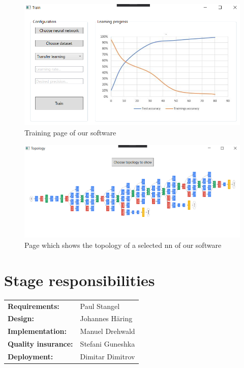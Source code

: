\documentclass[parskip=full]{scrartcl}
\begin{document}
\begin{figure}[htb!]\centering
\includegraphics[width=\textwidth]{TrainGUI}
\caption{Training page of our software}
\end{figure}
\begin{figure}[htb!]
\centering
\includegraphics[width=\textwidth]{TopoGUI}
\caption{Page which shows the topology of a selected \gls{nn} of our software}
\end{figure}
\clearpage

\section{Stage responsibilities}
\begin{tabular}{p{4cm}p{8cm}}
\textbf{Requirements:} & Paul Stangel\\
\textbf{Design:} & Johannes Häring\\
\textbf{Implementation:} & Manuel Drehwald\\
\textbf{Quality insurance:}& Stefani Guneshka\\
\textbf{Deployment:} & Dimitar Dimitrov
\end{tabular}
\end{document}
